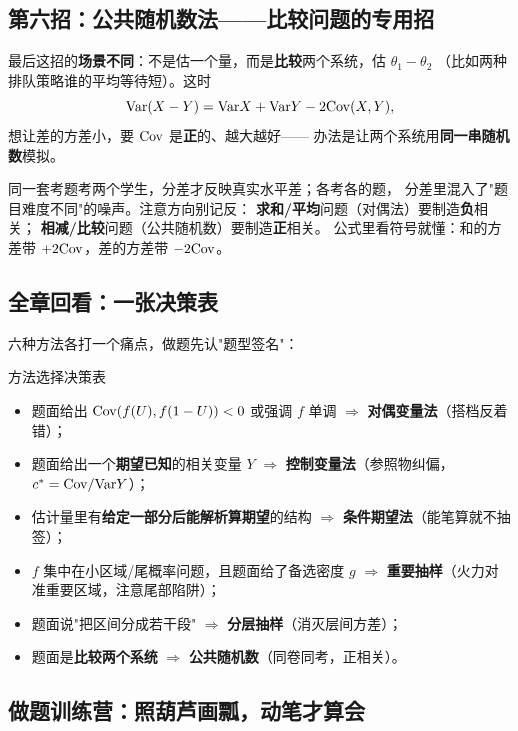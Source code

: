 \subsection{第六招：公共随机数法——比较问题的专用招}

最后这招的\textbf{场景不同}：不是估一个量，而是\textbf{比较}两个系统，估 $\theta_1-\theta_2$
（比如两种排队策略谁的平均等待短）。这时
\[
\mathrm{Var}(X-Y)=\mathrm{Var} X+\mathrm{Var} Y-2\mathrm{Cov}(X,Y),
\]
想让差的方差小，要 $\mathrm{Cov}$ 是\textbf{正}的、越大越好——
办法是让两个系统用\textbf{同一串随机数}模拟。

\begin{pbox}
同一套考题考两个学生，分差才反映真实水平差；各考各的题，
分差里混入了"题目难度不同"的噪声。注意方向别记反：
\textbf{求和/平均}问题（对偶法）要制造\textbf{负}相关；
\textbf{相减/比较}问题（公共随机数）要制造\textbf{正}相关。
公式里看符号就懂：和的方差带 $+2\mathrm{Cov}$，差的方差带 $-2\mathrm{Cov}$。
\end{pbox}

\subsection{全章回看：一张决策表}

六种方法各打一个痛点，做题先认"题型签名"：

\begin{kbox}{方法选择决策表}
\begin{itemize}[leftmargin=2em]
  \item 题面给出 $\mathrm{Cov}(f(U),f(1-U))<0$ 或强调 $f$ 单调 $\Rightarrow$ \textbf{对偶变量法}（搭档反着错）；
  \item 题面给出一个\textbf{期望已知}的相关变量 $Y$ $\Rightarrow$ \textbf{控制变量法}（参照物纠偏，$c^*=\mathrm{Cov}/\mathrm{Var} Y$）；
  \item 估计量里有\textbf{给定一部分后能解析算期望}的结构 $\Rightarrow$ \textbf{条件期望法}（能笔算就不抽签）；
  \item $f$ 集中在小区域/尾概率问题，且题面给了备选密度 $g$ $\Rightarrow$ \textbf{重要抽样}（火力对准重要区域，注意尾部陷阱）；
  \item 题面说"把区间分成若干段" $\Rightarrow$ \textbf{分层抽样}（消灭层间方差）；
  \item 题面是\textbf{比较两个系统} $\Rightarrow$ \textbf{公共随机数}（同卷同考，正相关）。
\end{itemize}
\end{kbox}

\subsection{做题训练营：照葫芦画瓢，动笔才算会}

